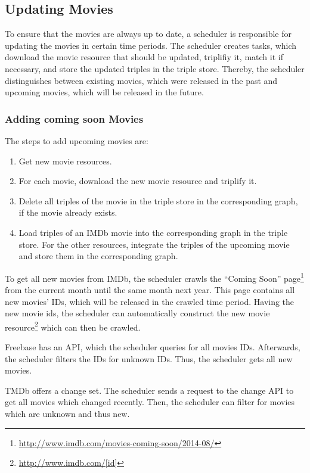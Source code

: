 \subsection{Updating Movies}
\label{subsec_method_updating}

To ensure that the movies are always up to date, a scheduler is responsible for updating the movies in certain time periods.
The scheduler creates tasks, which download the movie resource that should be updated, triplifiy it, match it if necessary, and store the updated triples in the triple store.
Thereby, the scheduler distinguishes between existing movies, which were released in the past and upcoming movies, which will be released in the future.

\subsubsection{Adding coming soon Movies}
The steps to add upcoming movies are:
\begin {enumerate}
	\item Get new movie resources.
	\item For each movie, download the new movie resource and triplify it.
	\item Delete all triples of the movie in the triple store in the corresponding graph, if the movie already exists.
	\item Load triples of an IMDb movie into the corresponding graph in the triple store. For the other resources, integrate the triples of the upcoming movie and store them in the corresponding graph.
\end{enumerate}

To get all new movies from IMDb, the scheduler crawls the ``Coming Soon'' page\footnote{\url{http://www.imdb.com/movies-coming-soon/2014-08/}} from the current month until the same month next year.
This page contains all new movies' IDs, which will be released in the crawled time period.
Having the new movie ids, the scheduler can automatically construct the new movie resource\footnote{\url{http://www.imdb.com/[id]}} which can then be crawled.

Freebase has an API, which the scheduler queries for all movies IDs.
Afterwards, the scheduler filters the IDs for unknown IDs.
Thus, the scheduler gets all new movies.

TMDb offers a change set.
The scheduler sends a request to the change API to get all movies which changed recently.
Then, the scheduler can filter for movies which are unknown and thus new.

